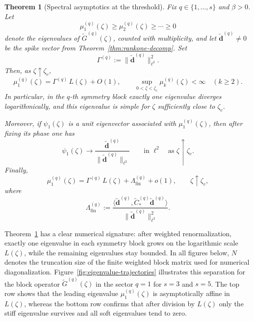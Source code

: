 \documentclass[11pt]{amsart}
\numberwithin{equation}{section}
\theoremstyle{plain}
\newtheorem{theorem}{Theorem}[section]
\theoremstyle{definition}
\theoremstyle{remark}
\begin{document}
\begin{theorem}[Spectral asymptotics at the threshold]
	\label{thm:spectral-asymptotics}
	Fix \(q\in\{1,\dots,s\}\) and \(\beta>0\). Let
	\[
		\mu_1^{(q)}(\zeta)\ge \mu_2^{(q)}(\zeta)\ge\cdots\ge0
	\]
	denote the eigenvalues of \(\widetilde G^{(q)}(\zeta)\), counted with
	multiplicity, and let \(\widetilde{\bm d}^{(q)}\neq0\) be the spike vector
	from Theorem~\ref{thm:rankone-decomp}. Set
	\[
		\Gamma^{(q)}:=\|\widetilde{\bm d}^{(q)}\|_{\ell^2}^2.
	\]
	Then, as \(\zeta\uparrow\zeta_c\),
	\begin{equation}\label{eq:mu-sing}
		\mu_1^{(q)}(\zeta)=\Gamma^{(q)}\,L(\zeta)+O(1),
		\qquad
		\sup_{0<\zeta<\zeta_c}\mu_k^{(q)}(\zeta)<\infty
		\quad (k\ge2).
	\end{equation}
	In particular, in the \(q\)-th symmetry block exactly one eigenvalue
	diverges logarithmically, and this eigenvalue is simple for \(\zeta\)
	sufficiently close to \(\zeta_c\).

	Moreover, if \(\psi_1(\zeta)\) is a unit eigenvector associated with
	\(\mu_1^{(q)}(\zeta)\), then after fixing its phase one has
	\begin{equation}\label{eq:psi-align}
		\psi_1(\zeta)\longrightarrow
		\frac{\widetilde{\bm d}^{(q)}}{\|\widetilde{\bm d}^{(q)}\|_{\ell^2}}
		\qquad\text{in }\ell^2
		\quad\text{as }\zeta\uparrow\zeta_c.
	\end{equation}
	Finally,
	\begin{equation}\label{eq:mu1-asymp}
		\mu_1^{(q)}(\zeta)
		=
		\Gamma^{(q)}\,L(\zeta)
		+
		\Lambda_{\mathrm{fin}}^{(q)}
		+o(1),
		\qquad \zeta\uparrow\zeta_c,
	\end{equation}
	where
	\[
		\Lambda_{\mathrm{fin}}^{(q)}
		:=
		\frac{\langle \widetilde{\bm d}^{(q)},
			\widetilde C_*^{(q)}\widetilde{\bm d}^{(q)}\rangle}
		{\|\widetilde{\bm d}^{(q)}\|_{\ell^2}^2}.
	\]
\end{theorem}

Theorem~\ref{thm:spectral-asymptotics} has a clear numerical signature:
after weighted renormalization, exactly one eigenvalue in each symmetry block
grows on the logarithmic scale \(L(\zeta)\), while the remaining eigenvalues
stay bounded. In all figures below, \(N\) denotes the truncation size of the
finite weighted block matrix used for numerical diagonalization. Figure~\ref{fig:eigenvalue-trajectories} illustrates this
separation for the block operator \(\widetilde G^{(q)}(\zeta)\) in the sector
\(q=1\) for \(s=3\) and \(s=5\). The top row shows that the leading eigenvalue
\(\mu_1^{(q)}(\zeta)\) is asymptotically affine in \(L(\zeta)\), whereas the
bottom row confirms that after division by \(L(\zeta)\) only the stiff eigenvalue
survives and all soft eigenvalues tend to zero.
\end{document}
